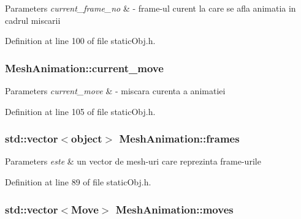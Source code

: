 \begin{DoxyParams}{Parameters}
{\em current\-\_\-frame\-\_\-no} & -\/ frame-\/ul curent la care se afla animatia in cadrul miscarii \\
\hline
\end{DoxyParams}


Definition at line 100 of file static\-Obj.\-h.

\hypertarget{class_mesh_animation_a0e99877081ae52a2b74d890a346a5298}{
\subsubsection[{current\-\_\-move}]{ Mesh\-Animation\-::current\-\_\-move}}\label{class_mesh_animation_a0e99877081ae52a2b74d890a346a5298}

\begin{DoxyParams}{Parameters}
{\em current\-\_\-move} & -\/ miscara curenta a animatiei \\
\hline
\end{DoxyParams}


Definition at line 105 of file static\-Obj.\-h.

\hypertarget{class_mesh_animation_a925b14f1959e8978bf2381cae04faddc}{
\subsubsection[{frames}]{\setlength{\rightskip}{0pt plus 5cm}std\-::vector$<${\bf object}$>$ Mesh\-Animation\-::frames}}\label{class_mesh_animation_a925b14f1959e8978bf2381cae04faddc}

\begin{DoxyParams}{Parameters}
{\em este} & un vector de mesh-\/uri care reprezinta frame-\/urile \\
\hline
\end{DoxyParams}


Definition at line 89 of file static\-Obj.\-h.

\hypertarget{class_mesh_animation_a143c0f0b32676ba0cc63c5596f129b21}{
\subsubsection[{moves}]{\setlength{\rightskip}{0pt plus 5cm}std\-::vector$<${\bf Move}$>$ Mesh\-Animation\-::moves}}\label{class_mesh_animation_a143c0f0b32676ba0cc63c5596f129b21}

